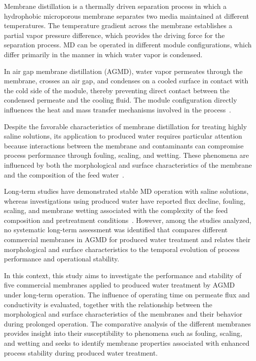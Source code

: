 Membrane distillation is a thermally driven separation process in which a hydrophobic microporous membrane separates two media maintained at different temperatures. The temperature gradient across the membrane establishes a partial vapor pressure difference, which provides the driving force for the separation process. MD can be operated in different module configurations, which differ primarily in the manner in which water vapor is condensed. 

In air gap membrane distillation (AGMD), water vapor permeates through the membrane, crosses an air gap, and condenses on a cooled surface in contact with the cold side of the module, thereby preventing direct contact between the condensed permeate and the cooling fluid. The module configuration directly influences the heat and mass transfer mechanisms involved in the process~\cite{Olatunji2018MDModeling,Yan2021MDWastewater,Kaur2023MDOverview,Adewole2022MDDesalination}.

Despite the favorable characteristics of membrane distillation for treating highly saline solutions, its application to produced water requires particular attention because interactions between the membrane and contaminants can compromise process performance through fouling, scaling, and wetting. These phenomena are influenced by both the morphological and surface characteristics of the membrane and the composition of the feed water~\cite{Yao2020WettabilityMD,AbdelKarim2021,Hsieh2024ScalingWetting}.

Long-term studies have demonstrated stable MD operation with saline solutions, whereas investigations using produced water have reported flux decline, fouling, scaling, and membrane wetting associated with the complexity of the feed composition and pretreatment conditions~\cite{Woo2021ElectrospunMD,Suga2021VMD,Hsieh2021Pretreatments,Nawaz2021FO_MD,Pawar2022AGMD}. However, among the studies analyzed, no systematic long-term assessment was identified that compares different commercial membranes in AGMD for produced water treatment and relates their morphological and surface characteristics to the temporal evolution of process performance and operational stability.

In this context, this study aims to investigate the performance and stability of five commercial membranes applied to produced water treatment by AGMD under long-term operation. The influence of operating time on permeate flux and conductivity is evaluated, together with the relationship between the morphological and surface characteristics of the membranes and their behavior during prolonged operation. The comparative analysis of the different membranes provides insight into their susceptibility to phenomena such as fouling, scaling, and wetting and seeks to identify membrane properties associated with enhanced process stability during produced water treatment.